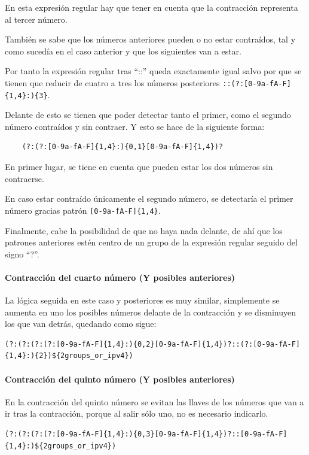 En esta expresión regular hay que tener en cuenta que la contracción representa al tercer número.

También se sabe que los números anteriores pueden o no estar contraídos, tal y como sucedía en el caso anterior y que los siguientes van a estar. 

Por tanto la expresión regular tras “::” queda exactamente igual salvo por que se tienen que reducir de cuatro a tres los números posteriores \verb!::(?:[0-9a-fA-F]{1,4}:){3}!.

Delante de esto se tienen que poder detectar tanto el primer, como el segundo número contraídos y sin contraer. Y esto se hace de la siguiente forma:

\begin{verbatim}
    (?:(?:[0-9a-fA-F]{1,4}:){0,1}[0-9a-fA-F]{1,4})?
\end{verbatim}

En primer lugar, se tiene en cuenta que pueden estar los dos números sin contraerse.

En caso estar contraído únicamente el segundo número, se detectaría el primer número gracias patrón \verb![0-9a-fA-F]{1,4}!.

Finalmente, cabe la posibilidad de que no haya nada delante, de ahí que los patrones anteriores estén centro de un grupo de la expresión regular seguido del signo “?”.

\paragraph{Contracción del cuarto número (Y posibles anteriores)}

La lógica seguida en este caso y posteriores es muy similar, simplemente se aumenta en uno los posibles números delante de la contracción y se disminuyen los que van detrás, quedando como sigue:
\begin{lstlisting}[breaklines, caption={Expresión regular para capturar dirección IPv6 con el cuarto número contraido (Y posibles anteriores)}, label={Regex:ipv6_4}, captionpos=b]
(?:(?:(?:(?:[0-9a-fA-F]{1,4}:){0,2}[0-9a-fA-F]{1,4})?::(?:[0-9a-fA-F]{1,4}:){2})${2groups_or_ipv4})
\end{lstlisting}

\paragraph{Contracción del quinto número (Y posibles anteriores)}
En la contracción del quinto número se evitan las llaves de los números que van a ir tras la contracción, porque al salir sólo uno, no es necesario indicarlo.
\begin{lstlisting}[breaklines, caption={Expresión regular para capturar dirección IPv6 con el quinto número contraido (Y posibles anteriores)}, label={Regex:ipv6_5}, captionpos=b]
(?:(?:(?:(?:[0-9a-fA-F]{1,4}:){0,3}[0-9a-fA-F]{1,4})?::[0-9a-fA-F]{1,4}:)${2groups_or_ipv4})
\end{lstlisting}

